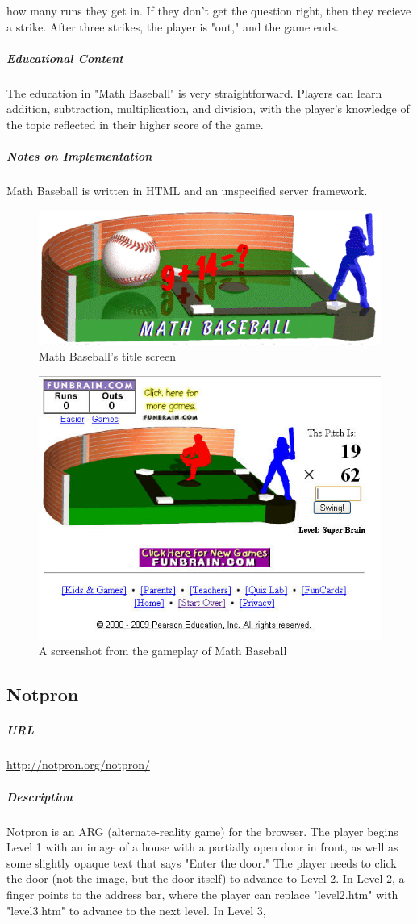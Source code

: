 how many runs they get in. If they don't get the question right, then they recieve a strike. After three strikes, the player is "out," and the game ends.\subparagraph{Educational Content}The education in "Math Baseball" is very straightforward. Players can learn addition, subtraction, multiplication, and division, with the player's knowledge of the topic reflected in their higher score of the game.\subparagraph{Notes on Implementation}Math Baseball is written in HTML and an unspecified server framework.\newpage\begin{figure}[h!]\centering \includegraphics[height=0.33\textheight]{img/baseball_title.jpg}\caption{Math Baseball's title screen}\end{figure}\begin{figure}[h!]\centering \includegraphics[height=0.33\textheight]{img/baseball_screen.jpg}\caption{A screenshot from the gameplay of Math Baseball}\end{figure}\subsection{Notpron}\subparagraph{URL}\url{http://notpron.org/notpron/}\subparagraph{Description}Notpron is an ARG (alternate-reality game) for the browser. The player begins Level 1 with an image of a house with a partially open door in front, as well as some slightly opaque text that says "Enter the door." The player needs to click the door (not the image, but the door itself) to advance to Level 2. In Level 2, a finger points to the address bar, where the player can replace "level2.htm" with "level3.htm" to advance to the next level. In Level 3, 